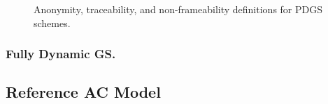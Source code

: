 \begin{figure}[ht!]
  \begin{center}
  \end{center}
  \caption{Anonymity, traceability, and non-frameability definitions for PDGS
    schemes. }
  \label{fig:pdgssec}
\end{figure}


\subsubsection{Fully Dynamic GS.} %
 \cite{bcc+16}

\subsection{Reference AC Model}
\label{ssec:refac}

